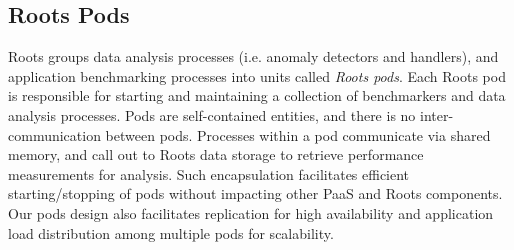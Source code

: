 
\subsection{Roots Pods}
\label{sec:process_mgt}


Roots groups data analysis processes (i.e. anomaly detectors and handlers), 
and application benchmarking processes into units called \textit{Roots pods}. 
Each Roots pod is responsible for starting and maintaining a collection of
benchmarkers and data analysis processes. 
Pods are self-contained entities, and there is no inter-communication
between pods. 
Processes within a pod communicate via 
shared memory, and call out to Roots data storage to retrieve 
performance measurements for analysis. Such encapsulation facilitates 
efficient starting/stopping of pods 
without impacting other PaaS and Roots components. Our pods design also facilitates
replication for high availability and application load distribution
among multiple pods for scalability.

